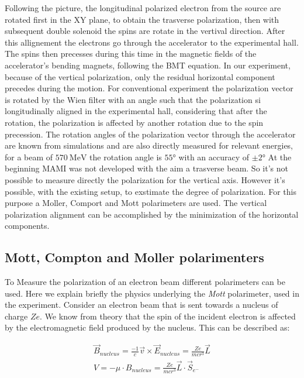 Following the picture, the longitudinal polarized electron from the source are rotated first in the XY plane, to obtain the trasverse polarization, then with subsequent double solenoid the spins are rotate in the vertival direction. 
After this allignement the electrons go through the accelerator to the experimental hall. The spins then precesses during this time in the magnetic fields of the accelerator's bending magnets, following the BMT equation.
In our experiment, because of the vertical polarization, only the residual horizontal component precedes during the motion. For conventional experiment the polarization vector is rotated by the Wien filter with an angle such that the polarization si longitudinally aligned in the experimental hall, considering that after the rotation, the polarization is affected by another rotation due to the spin precession. The rotation angles of the polarization vector through the accelerator are known from simulations and are also directly measured for relevant energies, for a beam of $\SI{570}{\mega \electronvolt}$ the rotation angle is $\ang{55}$ with an accuracy of $\pm \ang{2}$
At the beginning MAMI was not developed with the aim a trasverse beam. So it's not possible to measure directly the polarization for the vertical axis. However it's possible, with the existing setup, to exstimate the degree of polarization. For this purpose a Moller, Comport and Mott polarimeters are used. The vertical polarization alignment can be accomplished by the minimization of the horizontal components. 


\subsection{Mott, Compton and Moller polarimenters}

To Measure the polarization of an electron beam different polarimeters can be used. Here we explain briefly the physics underlying the \textit{Mott} polarimeter, used in the experiment.
Consider an electron beam that is sent towards a nucleus of charge $Ze$. We know from theory that the spin of the incident electron is affected by the electromagnetic field produced by the nucleus. This can be described as:

\begin{align*}
\vec{B}_{nucleus} = \frac{-1}{c} \vec{v} \times \vec{E}_{nucleus} = \frac{Ze}{mc r^{3}} \vec{L} \\
V = - \mu \cdot B_{nucleus} = \frac{Ze}{mcr^{3}} \vec{L} \cdot \vec{S}_{e^{-}}
\end{align*}

